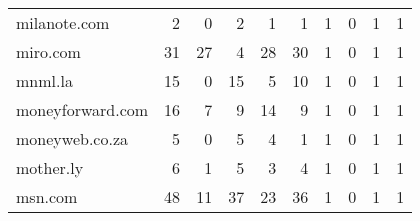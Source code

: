 \begin{tabular}{lrrrrrrrrr}
               milanote.com &                                2 &                                  0 &                                      2 &                            1 &                           1 &                                   1 &                                      0 &                             1 &                            1 \\
                   miro.com &                               31 &                                 27 &                                      4 &                           28 &                          30 &                                   1 &                                      0 &                             1 &                            1 \\
                    mnml.la &                               15 &                                  0 &                                     15 &                            5 &                          10 &                                   1 &                                      0 &                             1 &                            1 \\
           moneyforward.com &                               16 &                                  7 &                                      9 &                           14 &                           9 &                                   1 &                                      0 &                             1 &                            1 \\
             moneyweb.co.za &                                5 &                                  0 &                                      5 &                            4 &                           1 &                                   1 &                                      0 &                             1 &                            1 \\
                  mother.ly &                                6 &                                  1 &                                      5 &                            3 &                           4 &                                   1 &                                      0 &                             1 &                            1 \\
                    msn.com &                               48 &                                 11 &                                     37 &                           23 &                          36 &                                   1 &                                      0 &                             1 &                            1 \\

\end{tabular}
